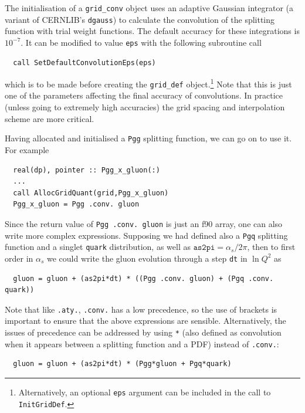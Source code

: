 \documentclass[12pt]{article}
\newcommand{\as}{\alpha_s}
\newcommand{\ttt}[1]{\texttt{#1}}
\begin{document}
The initialisation of a \texttt{grid\_conv} object uses an adaptive
Gaussian integrator (a variant of CERNLIB's \texttt{dgauss}) to
calculate the convolution of the splitting function with trial weight
functions. The default accuracy for these integrations is $10^{-7}$.
It can be modified to value \texttt{eps} with the following subroutine
call
\begin{verbatim}
  call SetDefaultConvolutionEps(eps)
\end{verbatim}
which is to be made before creating the \ttt{grid\_def}
object.\footnote{Alternatively, an optional \ttt{eps} argument can be
  included in the call to \ttt{InitGridDef}.}  Note that this is just
one of the parameters affecting the final accuracy of convolutions. In
practice (unless going to extremely high accuracies) the grid spacing
and interpolation scheme are more critical.

Having allocated and initialised a \texttt{Pgg} splitting function, we
can go on to use it. For example 
\begin{verbatim}
  real(dp), pointer :: Pgg_x_gluon(:)
  ...
  call AllocGridQuant(grid,Pgg_x_gluon)
  Pgg_x_gluon = Pgg .conv. gluon
\end{verbatim}  
Since the return value of \texttt{Pgg .conv.\ gluon} is just an f90
array, one can also write more complex expressions. Supposing we had
defined also a \texttt{Pgq} splitting function and a singlet
\texttt{quark} distribution, as well as $\texttt{as2pi} = \as/2\pi$,
then to first order in $\as$ we could write the gluon evolution
through a step \texttt{dt} in $\ln Q^2$ as
\begin{verbatim}
  gluon = gluon + (as2pi*dt) * ((Pgg .conv. gluon) + (Pgq .conv. quark))
\end{verbatim}
Note that like \texttt{.aty.}, \texttt{.conv.} has a low precedence,
so the use of brackets is important to ensure that the above
expressions are sensible. Alternatively, the issues of precedence can
be addressed by using \texttt{*} (also defined as convolution when it
appears between a splitting function and a PDF) instead of
\texttt{.conv.}:
\begin{verbatim}
  gluon = gluon + (as2pi*dt) * (Pgg*gluon + Pgq*quark)
\end{verbatim}


\end{document}
